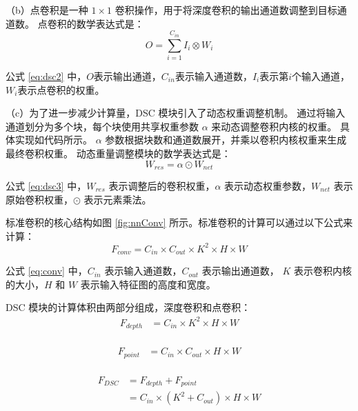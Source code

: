 （b）点卷积是一种 $1\times1$ 卷积操作，用于将深度卷积的输出通道数调整到目标通道数。 点卷积的数学表达式是：
\begin{equation}
    \label{eq:dsc2}
    O = \sum\limits_{i=1}^{C_{in}}I_i\otimes{W_i}
\end{equation}

公式 \ref{eq:dsc2} 中，$O$表示输出通道，$C_{in}$表示输入通道数，$I_i$表示第$i$个输入通道，$W_i$表示点卷积的权重。

（c）为了进一步减少计算量，DSC 模块引入了动态权重调整机制。 通过将输入通道划分为多个块，每个块使用共享权重参数 $\alpha$ 来动态调整卷积内核的权重。 具体实现如代码所示。 $\alpha$ 参数根据块数和通道数展开，并乘以卷积内核权重来生成最终卷积权重。 动态重量调整模块的数学表达式是：
\begin{equation}
    \label{eq:dsc3}
    W_{res} = \alpha\odot{W_{net}}
\end{equation}

公式 \ref{eq:dsc3} 中，$W_{res}$ 表示调整后的卷积权重，$\alpha$ 表示动态权重参数，$W_{net}$ 表示原始卷积权重，$\odot$ 表示元素乘法。

标准卷积的核心结构如图 \ref{fig:nnConv} 所示。标准卷积的计算可以通过以下公式来计算：
\begin{equation}
    \label{eq:conv}
    F_{conv} = {C_{in}}\times{C_{out}}\times{K^2}\times{H}\times{W}
\end{equation}

公式 \ref{eq:conv} 中，$C_{in}$ 表示输入通道数，$C_{out}$ 表示输出通道数， $K$ 表示卷积内核的大小，$H$ 和 $W$ 表示输入特征图的高度和宽度。 

DSC 模块的计算体积由两部分组成，深度卷积和点卷积：
\begin{equation}
\begin{aligned}
    F_{depth} &= {C_{in}}\times{K^2}\times{H}\times{W} \\
\end{aligned} 
\label{eq:dsconv_depth}
\end{equation}

\begin{equation}
\begin{aligned}
    F_{point} &= {C_{in}}\times{C_{out}}\times{H}\times{W} \\
\end{aligned} 
\label{eq:dsconv_point}
\end{equation}

\begin{equation}
\begin{aligned}
    F_{DSC} &= F_{depth} + F_{point} \\
            &= {C_{in}}\times\left({K^2+C_{out}}\right)\times{H}\times{W}
\end{aligned} 
\label{eq:dsconv}
\end{equation}

